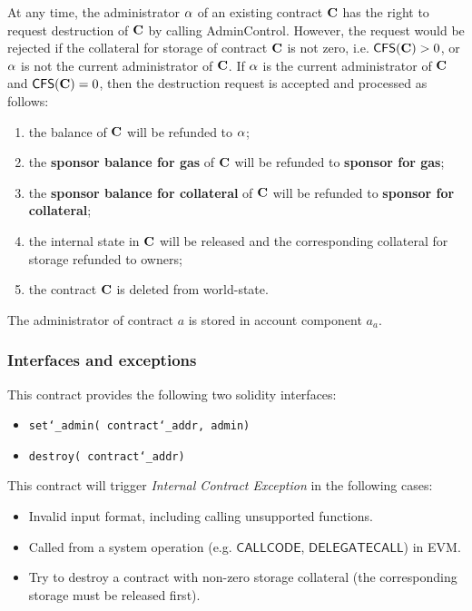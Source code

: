 At any time, the administrator $\mathbf{\alpha}$ of an existing contract $\mathbf{C}$ has the right to request destruction of $\mathbf{C}$ by calling AdminControl.
However, the request would be rejected if the collateral for storage of contract $\mathbf{C}$ is not zero, i.e. $\mathsf{CFS}(\mathbf{C})>0$, or $\mathbf{\alpha}$ is not the current administrator of $\mathbf{C}$.
If $\mathbf{\alpha}$ is the current administrator of $\mathbf{C}$ and $\mathsf{CFS}(\mathbf{C})=0$, then the destruction request is accepted and processed as follows:
\begin{enumerate}[nosep]
 	\item the balance of $\mathbf{C}$ will be refunded to $\mathbf{\alpha}$; 

	\item the \textbf{sponsor balance for gas} of $\mathbf{C}$ will be refunded to \textbf{sponsor for gas};

	\item the \textbf{sponsor balance for collateral} of $\mathbf{C}$ will be refunded to \textbf{sponsor for collateral};

	\item the internal state in $\mathbf{C}$ will be released and the corresponding collateral for storage refunded to owners;

	\item the contract $\mathbf{C}$ is deleted from world-state.
\end{enumerate} 

The administrator of contract $a$ is stored in account component $a_a$. 

\subsubsection{Interfaces and exceptions}

This contract provides the following two solidity interfaces:
\begin{itemize}[nosep]
	\item {\tt set\char`_admin( contract\char`_addr,  admin)}
    \item {\tt destroy( contract\char`_addr)}
\end{itemize}

This contract will trigger \emph{Internal Contract Exception} in the following cases:
\begin{itemize}[nosep]
	\item Invalid input format, including calling unsupported functions.

	\item Called from a system operation (e.g. $\mathsf{CALLCODE}$, $\mathsf{DELEGATECALL}$) in EVM.
    \item Try to destroy a contract with non-zero storage collateral (the corresponding storage must be released first). 
\end{itemize}

